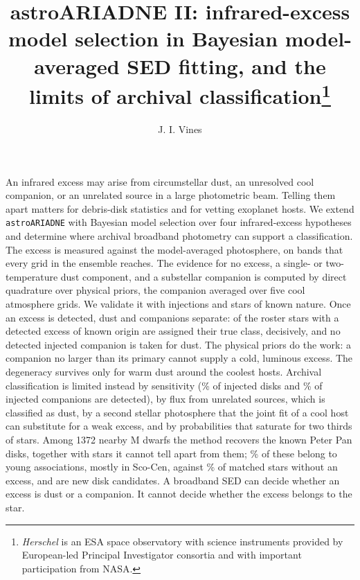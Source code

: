 \documentclass{aa}
\newcommand{\ariadne}{\texttt{astroARIADNE}}
\begin{document}
\title{astroARIADNE II: infrared-excess model selection in Bayesian
       model-averaged SED fitting, and the limits of archival
       classification\thanks{{\it Herschel} is an ESA space observatory with
       science instruments provided by European-led Principal Investigator
       consortia and with important participation from NASA.}}

\author{J. I. Vines}

\abstract
{An infrared excess may arise from circumstellar dust, an unresolved cool
companion, or an unrelated source in a large photometric beam. Telling them apart
matters for debris-disk statistics and for vetting exoplanet hosts.}
{We extend \ariadne{} with Bayesian model selection over four infrared-excess
hypotheses and determine where archival broadband photometry can support a
classification.}
{The excess is measured against the model-averaged photosphere, on bands that
every grid in the ensemble reaches. The evidence for no excess, a
single- or two-temperature dust component, and a substellar companion is computed
by direct quadrature over physical priors, the companion averaged over five cool
atmosphere grids. We validate it with \nInj{} injections and \nRoster{} stars of known
nature.}
{Once an excess is detected, dust and companions separate: \rosDCok{} of the \rosDC{} roster
stars with a detected excess of known origin are assigned their true class,
decisively, and no detected injected companion is taken for dust. The
physical priors do the work: a companion no larger than its primary cannot supply
a cold, luminous excess. The degeneracy survives only for warm dust
around the coolest hosts. Archival classification is limited instead by
sensitivity (\injDiskFlagPctInt\% of injected disks and \injCompFlagPct\% of injected companions are
detected), by flux from unrelated sources, which is classified as dust, by a
second stellar photosphere that the joint fit of a cool host can substitute for a
weak excess, and by
probabilities that saturate for two thirds of stars. Among 1372 nearby M dwarfs the method recovers the known
Peter Pan disks, together with \svPoolOther{} stars it cannot tell apart from them; \banPoolPct\% of
these belong to young associations, mostly in Sco-Cen, against \banCtlPct\% of matched
stars without an excess, and \candN{} are new disk candidates.}
{A broadband SED can decide whether an excess is dust or a companion. It cannot
decide whether the excess belongs to the star.}
\end{document}
